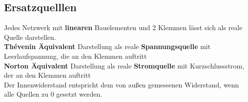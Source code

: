 																				 \iend

																				 \newpage

																				\subsection{Ersatzquelllen}


																				\beginip
																				Jedes Netzwerk mit \textbf{linearen} Bauelementen und 2 Klemmen lässt sich als reale Quelle darstellen. \\
																				\textbf{Thévenin Äquivalent} Darstellung als reale \textbf{Spannungsquelle} mit Leerlaufspannung, die an den Klemmen auftritt \\
																				\textbf{Norton Äquivalent} Darstellung als reale \textbf{Stromquelle}  mit Kurzschlussstrom, der an den Klemmen auftritt\\
																				Der Innenwiderstand entspricht dem von außen gemessenen Widerstand, wenn alle Quellen zu 0 gesetzt werden.
																				\begin{center}
																					\fix
																				\end{center}
																				\iend


